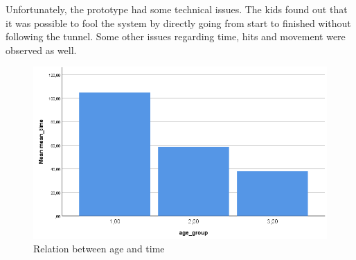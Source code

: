 Unfortunately, the prototype had some technical issues. The kids found out that it was possible to fool the system by directly going from start to finished without following the tunnel. Some other issues regarding time, hits and movement were observed as well. 


\begin{figure}[!ht]
    \centering
    \includegraphics[width=.6\textwidth]{figures/relationTimeAge.png}
    \caption{Relation between age and time}
    \label{fig:relationTimeAge}
\end{figure}

